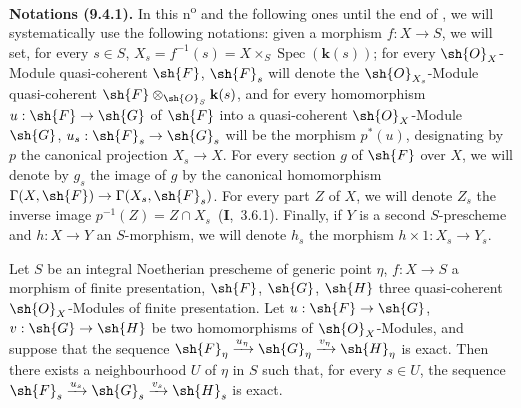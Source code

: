 \begin{env}[9.4.1]
\label{IV.9.4.1}
\textbf{Notations (9.4.1).}
In this n\textsuperscript{o} and the following ones until the end of , we will systematically use the following notations: given a morphism $f:X\to S$, we will set, for every $s\in S$, $X_s=f^{-1}(s)=X\times_S\operatorname{Spec}(\mathbf{k}(s))$; for every $\sh{O}_X$-Module quasi-coherent $\sh{F}$, $\sh{F}_s$ will denote the $\sh{O}_{X_s}$-Module quasi-coherent $\sh{F}\otimes_{\sh{O}_S}\mathbf{k}(s)$, and for every homomorphism $u:\sh{F}\to\sh{G}$ of $\sh{F}$ into a quasi-coherent $\sh{O}_X$-Module $\sh{G}$, $u_s:\sh{F}_s\to\sh{G}_s$ will be the morphism $p^*(u)$, designating by $p$ the canonical projection $X_s\to X$.
For every section $g$ of $\sh{F}$ over $X$, we will denote by $g_s$ the image of $g$ by the canonical homomorphism $\Gamma(X,\sh{F})\to\Gamma(X_s,\sh{F}_s)$.
For every part $Z$ of $X$, we will denote $Z_s$ the inverse image $p^{-1}(Z)=Z\cap X_s$~(\textbf{I},~3.6.1).
Finally, if $Y$ is a second $S$-prescheme and $h:X\to Y$ an $S$-morphism, we will denote $h_s$ the morphism $h\times 1:X_s\to Y_s$.
\end{env}

\begin{proposition}[9.4.2]
\label{IV.9.4.2}
Let $S$ be an integral Noetherian prescheme of generic point $\eta$, $f:X\to S$ a morphism of finite presentation, $\sh{F}$, $\sh{G}$, $\sh{H}$ three quasi-coherent $\sh{O}_X$-Modules of finite presentation.
Let $u:\sh{F}\to\sh{G}$, $v:\sh{G}\to\sh{H}$ be two homomorphisms of $\sh{O}_X$-Modules, and suppose that the sequence $\sh{F}_\eta\xrightarrow{u_\eta}\sh{G}_\eta\xrightarrow{v_\eta}\sh{H}_\eta$ is exact.
Then there exists a neighbourhood $U$ of $\eta$ in $S$ such that, for every $s\in U$, the sequence $\sh{F}_s\xrightarrow{u_s}\sh{G}_s\xrightarrow{v_s}\sh{H}_s$ is exact.
\end{proposition}

